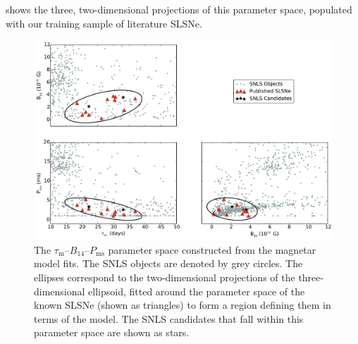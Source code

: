 \noindent {} shows the three, two-dimensional projections of this parameter space, populated with our training sample of literature SLSNe.

\begin{figure}
\includegraphics[width=\textwidth]{Figures/Chapter3/SLAPparam}
\caption{The $\tau_\mathrm{m}$--$B_{14}$--$P_{\mathrm{ms}}$ parameter space constructed from the magnetar model fits. The SNLS objects are denoted by grey circles. The ellipses correspond to the two-dimensional projections of the three-dimensional ellipsoid, fitted around the parameter space of the known SLSNe (shown as triangles) to form a region defining them in terms of the model. The SNLS candidates that fall within this parameter space are shown as stars.}
\label{fig:SLAPparam}
\end{figure}

